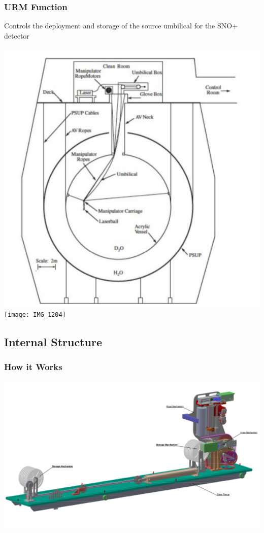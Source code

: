 \documentclass{beamer}
\begin{document}
\begin{frame}
\frametitle{URM Function}
Controls the deployment and storage of the source umbilical for the SNO+ detector\\~\\
\centering\includegraphics[width=0.5\linewidth]{avdia}
\centering\texttt{[image: IMG\_1204]}
\end{frame}




\subsection{Internal Structure}
\begin{frame}
\frametitle{How it Works}
\centering\includegraphics[width=1\linewidth]{scehm}
\end{frame}
\end{document}
